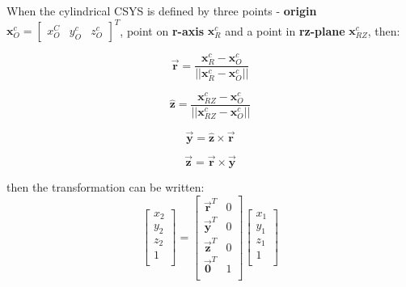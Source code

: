 \documentclass[10pt,b5paper,titlepage]{book}
\newcommand{\m}{\mathbf}
\begin{document}
\begin{enumerate}
        When the cylindrical CSYS is defined by three points - \textbf{origin}
         $ \m{x}_O^c = \begin{bmatrix} x_O^C & y_O^c & z_O^c \end{bmatrix}^T $,
         point on \textbf{r-axis} $ \m{x}_{R}^c $
        and a point in \textbf{rz-plane} $ \m{x}_{RZ}^c $, then:

        \begin{equation}
            \vec{\m{r}} = \frac{\m{x}_R^c - \m{x}_O^c}{||\m{x}_R^c - \m{x}_O^c||}
        \end{equation}

        \begin{equation}
            \hat{\m{z}} = \frac{\m{x}_{RZ}^c - \m{x}_O^c}{||\m{x}_{RZ}^c - \m{x}_O^c||}
        \end{equation}

        \begin{equation}
            \vec{\m{y}} = \hat{\m{z}} \times \vec{\m{r}}
        \end{equation}

        \begin{equation}
            \vec{\m{z}} = \vec{\m{r}} \times \vec{\m{y}}
        \end{equation}

        then the transformation can be written:
        \begin{equation}
            \begin{bmatrix}
                x_2 \\
                y_2 \\
                z_2 \\
                1 \\
            \end{bmatrix}
            = \begin{bmatrix}
                \vec{\m{r}}^T & 0 \\
                \vec{\m{y}}^T & 0 \\
                \vec{\m{z}}^T & 0 \\
                \vec{\m{0}}^T & 1 \\
            \end{bmatrix}
            \begin{bmatrix}
                x_1 \\
                y_1 \\
                z_1 \\
                1 \\
            \end{bmatrix}
        \end{equation}


\end{enumerate}
\end{document}
